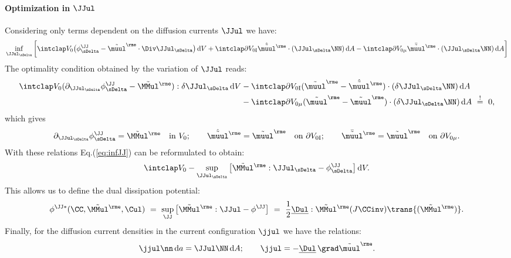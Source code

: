 \paragraph{Optimization in $\JJul$} \label{sec:optJ}%
Considering only terms dependent on the diffusion currents $\JJul$ we have:
\begin{align}
  \inf_{\JJulDelta} \bigg[\intVO \big( \phiJJDelta - \muuletilde \cdot \Div \JJulDelta \big) \dV 
  + \intdVOx{I} \hat\muultilde^\rme \cdot (\JJulDelta \NN) \dA 
  - \intdVOx{\mu} \bar\muultilde^\rme \cdot (\JJulDelta\NN)\dA\bigg]
  \label{eq:infJJ}
\end{align}
The optimality condition obtained by the variation of $\JJul$ reads:
\begin{align}
  \begin{aligned}
  \intVO (\dJJul\phiJJDelta-\MMuletilde):\delta\JJulDelta \dV  
  &- \intdVOx{I} (\muuletilde - \hat{\tilde\muul}^{\rme})\cdot(\delta\JJulDelta\NN)\dA \\
  &- \intdVOx{\mu} (\muuletilde - \tilde\muul^{\rme}) \cdot(\delta\JJulDelta\NN)\dA \ \stackrel{!}{=} \ 0,
  \end{aligned}
\end{align}
which gives
\begin{align}
  \dJJul \phiJJDelta = \MMuletilde \quad\text{in} \ V_0; \qquad 
  \hat{\tilde\muul}^\rme = \muuletilde \quad \text{on} \ \partial V_{0\rm I} ; \qquad 
  \bar{\tilde\muul}^\rme = \muuletilde \quad \text{on} \ \partial V_{0\mu}.
\end{align}
With these relations Eq.(\ref{eq:infJJ}) can be reformulated to obtain:
\begin{align}
   \intVO -\sup_{\JJulDelta} \big[ \MMuletilde:\JJulDelta - \phiJJDelta \big] \dV.
\end{align}
This allows us to define the dual dissipation potential: 
\begin{align}
  \phiJJs(\CC,\MMuletilde,\Cul) \ = \ \sup_{\JJ}\big[\MMuletilde:\JJul - \phiJJ \big] \ = \ \frac{1}{2}\Dull:\MMuletilde (J\CCinv)\trans{(\MMuletilde)}.
\end{align}
Finally, for the diffusion current densities in the current configuration $\jjul$ we have the relations:
\begin{align}
  \jjul\nn\,\rmd a = \JJul\NN\dA; \qquad \jjul = -\Dull \, \grad\muuletilde.
\end{align}

